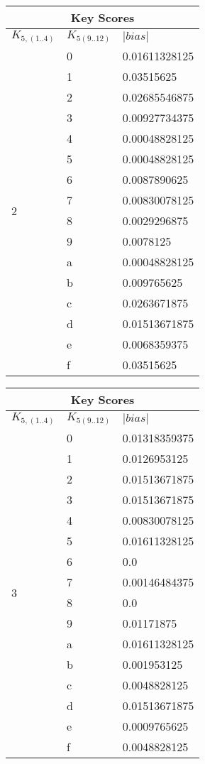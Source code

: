 \documentclass{elsart}
\begin{document}
\begin{tabular}{|l|l|l|}
\hline
\multicolumn{3}{|c|}{Key Scores} \\
\hline
$K_{5,(1..4)}$ & $K_{5(9..12)}$ & $|bias|$  \\ \hline
 \multirow{16}{*}{2} & 0 & 0.01611328125 \\
 & 1 & 0.03515625 \\
 & 2 & 0.02685546875 \\
 & 3 & 0.00927734375 \\
 & 4 & 0.00048828125 \\
 & 5 & 0.00048828125 \\
 & 6 & 0.0087890625 \\
 & 7 & 0.00830078125 \\
 & 8 & 0.0029296875 \\
 & 9 & 0.0078125 \\
 & a & 0.00048828125 \\
 & b & 0.009765625 \\
 & c & 0.0263671875 \\
 & d & 0.01513671875 \\
 & e & 0.0068359375 \\
 & f & 0.03515625 \\ \hline
\end{tabular}
\begin{tabular}{|l|l|l|}
\hline
\multicolumn{3}{|c|}{Key Scores} \\
\hline
$K_{5,(1..4)}$ & $K_{5(9..12)}$ & $|bias|$  \\ \hline
\multirow{16}{*}{3} & 0 & 0.01318359375 \\
 & 1 & 0.0126953125 \\
 & 2 & 0.01513671875 \\
 & 3 & 0.01513671875 \\
 & 4 & 0.00830078125 \\
 & 5 & 0.01611328125 \\
 & 6 & 0.0 \\
 & 7 & 0.00146484375 \\
 & 8 & 0.0 \\
 & 9 & 0.01171875 \\
 & a & 0.01611328125 \\
 & b & 0.001953125 \\
 & c & 0.0048828125 \\
 & d & 0.01513671875 \\
 & e & 0.0009765625 \\
 & f & 0.0048828125 \\ \hline
 \end{tabular}
 
\end{document}
